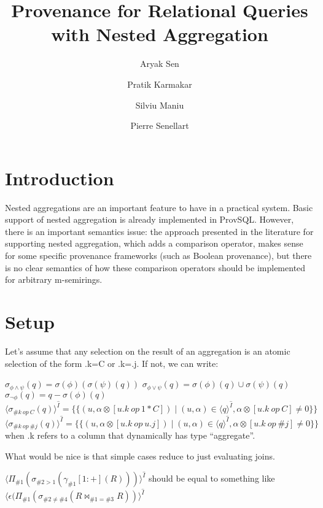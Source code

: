 \documentclass[10pt,a4paper]{scrartcl}
\title{Provenance for Relational Queries with Nested Aggregation}
\author{Aryak Sen \and Pratik Karmakar \and Silviu Maniu \and Pierre Senellart}
\date{}
\theoremstyle{definition}
\theoremstyle{remark}
\begin{document}
\maketitle
\section{Introduction}
Nested aggregations are an important feature to
have in a practical system. Basic support of nested aggregation
is already implemented in ProvSQL. However, there is an
important semantics issue: the approach presented in the
literature for supporting nested aggregation, which adds a
comparison operator, makes sense for some specific provenance
frameworks (such as Boolean provenance), but there is no
clear semantics of how these comparison operators should
be implemented for arbitrary m-semirings.
\section{Setup}
Let's assume that any selection on the result of an aggregation is an 
atomic selection of the form .k=C or .k=.j. If not, we can write:

$\sigma_{\phi\land\psi}(q)=\sigma(\phi)(\sigma(\psi)(q))$
$\sigma_{\phi\lor\psi}(q)=\sigma(\phi)(q)\cup\sigma(\psi)(q)$
$\sigma_{\lnot\phi}(q)=q-\sigma(\phi)(q)$\\

$
\langle\sigma_{\#k\ op\ C}(q)\rangle^{\hat I}
=\{\{(u,\alpha\otimes[u.k\ op\ 1*C])\mid(u,\alpha)\in \langle q\rangle^{\hat I}, \alpha\otimes[u.k\ op\ C]\neq 0\}\}
$\\

$
\langle\sigma_{\#k\ op\ \#j}(q)\rangle^{\hat I}
=\{\{(u,\alpha\otimes[u.k\ op\ u.j])\mid(u,\alpha)\in \langle q\rangle^{\hat I}, \alpha\otimes[u.k\ op\ \#j]\neq 0\}\}
$\\
when .k refers to a column that dynamically has type “aggregate”.


What would be nice is that simple cases reduce to just evaluating joins.

$\langle\Pi_{\#1}(\sigma_{\#2>1}(\gamma_{\#1}[1:+](R)))\rangle^{\hat I}$
should be equal to something like
$\langle \epsilon(\Pi_{\#1}(\sigma_{\#2\neq\#4}(R\bowtie_{\#1=\#3} R))\rangle^{\hat I}$
\end{document}

